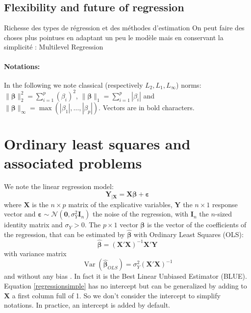 \documentclass[12pt,a4paper]{report}
\begin{document}
			
		\subsection{Flexibility and future of regression}
			Richesse des types de régression et des méthodes d'estimation
			On peut faire des choses plus pointues en adaptant un peu le modèle mais en conservant la simplicité : Multilevel Regression \cite{moerbeek2003comparison,maas2004robustness,hox1998multilevel}




\paragraph{Notations:}	
In the following we note classical (respectively $L_2,L_1,L_{\infty}$) norms: $\parallel\boldsymbol{\beta}\parallel_2^2=\sum_{i=1}^p(\beta_i)^2$, $\parallel\boldsymbol{\beta} \parallel_1=\sum_{i=1}^p|\beta_i| $ and $\parallel\boldsymbol{\beta} \parallel_{\infty}=\operatorname{max}(|\beta_1|,\dots,|\beta_p|)$. Vectors are in bold characters.
	\section{Ordinary least squares and associated problems}\label{sectionOLS}		%

We note the linear regression model:
\begin{equation}
		\boldsymbol{Y}_{|\boldsymbol{X}}=\boldsymbol{X}\boldsymbol{\beta} + \boldsymbol{\varepsilon} \label{regressionsimple}
	\end{equation}
	where $\boldsymbol{X}$ is the $n\times p$ matrix of the explicative variables,%
	 $\boldsymbol{Y}$ the  $n\times 1$ response vector and $\boldsymbol{\varepsilon} \sim \mathcal{N}(\boldsymbol{0},\sigma_Y^2\boldsymbol{I}_n)$ the noise of the regression, with $\boldsymbol{I}_n$ the $n$-sized identity matrix and $\sigma_Y >0$. The $p\times 1$ vector $\boldsymbol{\beta}$ is the vector of the coefficients of the regression, that can be estimated by $\hat{\boldsymbol{\beta}}$ with Ordinary Least Squares (\textsc{OLS}): %
	\begin{equation}
		\boldsymbol{\hat{\beta}}=\left(\boldsymbol{X}'\boldsymbol{X} \right) ^{-1}\boldsymbol{X}'\boldsymbol{Y}\label{betaOLS}
	\end{equation}
	with variance matrix
	\begin{equation}
		\operatorname{Var}(\hat{\boldsymbol{\beta}}_{OLS})=\sigma_Y^2\left(\boldsymbol{X}'\boldsymbol{X} \right) ^{-1} \label{eqOLS}
	\end{equation}
	and without any bias \cite{saporta2006probabilites,dodge2004analyse}. In fact it is the Best Linear Unbiased Estimator (BLUE).
	\\
	Equation \ref{regressionsimple}	has no intercept but can be generalized by adding to $\boldsymbol{X}$ a first column full of 1. So we don't consider the intercept to simplify notations. In practice, an intercept is added by default.
	
\end{document}
